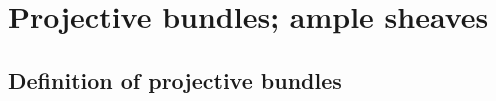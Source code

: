 \section{Projective bundles; ample sheaves}
\label{section:2.4}


\subsection{Definition of projective bundles}
\label{subsection:2.4.1}










